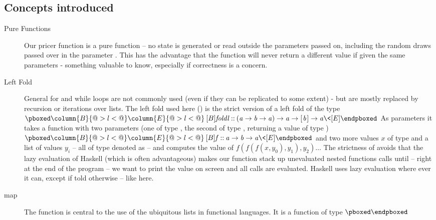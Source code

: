 \documentclass{scrartcl}
\newcommand{\Varid}[1]{\mathit{#1}}
\def\resethooks{%
  \global\let\SaveRestoreHook\empty
  \global\let\ColumnHook\empty}
\let\hspre\empty
\let\hspost\empty
\newenvironment{colorcode}{%
  \colorsurround
  \(%
  \pboxed\SaveRestoreHook}{%
  \ColumnHook\endpboxed
  \)%
  \endcolorsurround}
\begin{document}
\subsection{Concepts introduced}

\begin{description}
\item[Pure Functions] Our pricer function  is a pure function -- no state is generated or read outside the parameters passed on, including the random draws passed over in the parameter . This has the advantage that the function will never return a different value if given the same parameters - something valuable to know, especially if correctness is a concern.
\item[Left Fold] General for and while loops are not commonly used (even if they can be replicated to some extent) - but are mostly replaced by recursion or iterations over lists. The left fold used here () is the strict version of a left fold of the type
\begin{colorcode}
\column{B}{@{}>{\hspre}l<{\hspost}@{}}%
\column{E}{@{}>{\hspre}l<{\hspost}@{}}%
\>[B]{}\Varid{foldl}\mathbin{::}(\Varid{a}\to \Varid{b}\to \Varid{a})\to \Varid{a}\to [\mskip1.5mu \Varid{b}\mskip1.5mu]\to \Varid{a}{}\<[E]%
\end{colorcode}\resethooks
As parameters it takes a function with two parameters (one of type , the second of type , returning a value of type )
\begin{colorcode}
\column{B}{@{}>{\hspre}l<{\hspost}@{}}%
\column{E}{@{}>{\hspre}l<{\hspost}@{}}%
\>[B]{}\Varid{f}\mathbin{::}\Varid{a}\to \Varid{b}\to \Varid{a}{}\<[E]%
\end{colorcode}\resethooks
and two more values $x$ of type  and a list of values $y_i$ -- all of type  denoted as  -- and computes the value of $f(f(f(x, y_0), y_1), y_2) \dots$
The strictness of  avoids that the lazy evaluation of Haskell (which is often advantageous) makes our function stack up unevaluated nested functions calls until -- right at the end of the program -- we want to print the value on screen and all calls are evaluated. Haskell uses lazy evaluation where ever it can, except if told otherwise -- like here.
\item[map] The function  is central to the use of the ubiquitous lists in functional languages. It is a function of type 
\begin{colorcode}

\end{colorcode}
\end{description}
\end{document}
